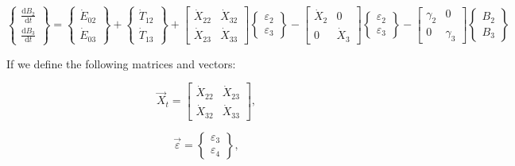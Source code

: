 \begin{equation} \label{eq:C-Expanded_Matrix_Form}
	\begin{Bmatrix}
		\frac{\mathrm{d}B_{2}}{\mathrm{d}t} \\[0.4em] %
		\frac{\mathrm{d}B_{3}}{\mathrm{d}t} 
	\end{Bmatrix}
	=
	\begin{Bmatrix}
		\dot{E}_{02}\\
		\dot{E}_{03}
	\end{Bmatrix}
	+
	\begin{Bmatrix}
		\dot{T}_{12}\\
		\dot{T}_{13}
	\end{Bmatrix}
	+
	\begin{bmatrix}
		\dot{X}_{22} & \dot{X}_{32}\\
		\dot{X}_{23} & \dot{X}_{33}
	\end{bmatrix}
	\begin{Bmatrix}
		\varepsilon_{2}\\
		\varepsilon_{3}
	\end{Bmatrix}
	-
	\begin{bmatrix}
		\dot{X}_{2} & 0          \\
		0           & \dot{X}_{3}
	\end{bmatrix}
	\begin{Bmatrix}
		\varepsilon_{2}\\
		\varepsilon_{3}
	\end{Bmatrix}	
	-
	\begin{bmatrix}
		\gamma_{2} & 0          \\
		0          & \gamma_{3}
	\end{bmatrix}
	\begin{Bmatrix}
		B_{2}\\
		B_{3}
	\end{Bmatrix}
\end{equation}

\noindent{}If we define the following matrices and vectors:

\begin{equation} \label{eq:X_t_matrix_def}
	\vec{X}_{t} 
	=
	\begin{bmatrix}
		\dot{X}_{22} & \dot{X}_{23} \\
		\dot{X}_{32} & \dot{X}_{33}
	\end{bmatrix},
\end{equation}

\begin{equation} \label{eq:eps_vec_def}
	\vec{\varepsilon} 
	=
	\begin{Bmatrix}
		\varepsilon_{3}	\\
		\varepsilon_{4}
	\end{Bmatrix},
\end{equation}

